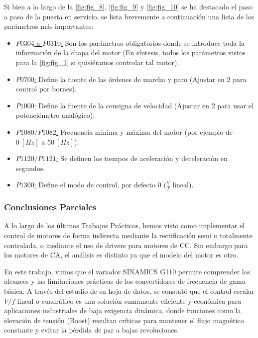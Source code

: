 \documentclass[12pt,a4paper]{article}
\begin{document}
\begin{itemize}
    Si bien a lo largo de la \autoref{fig:fig_8}, \autoref{fig:fig_9} y \autoref{fig:fig_10} se ha destacado el paso a paso de la puesta en servicio, se lista brevemente a continuación una lista de los parámetros más importantes:
    \begin{itemize}
        \item \underline{$P0304$ a $P0310$:} Son los parámetros obligatorios donde se introduce toda la información de la chapa del motor (En síntesis, todos los parámetros vistos para la \autoref{fig:fig_1} si quisiéramos controlar tal motor).
        \item \underline{$P0700$:} Define la fuente de las órdenes de marcha y paro (Ajustar en 2 para control por bornes).
        \item \underline{$P1000$:} Define la fuente de la consigna de velocidad (Ajustar en 2 para usar el potenciómetro analógico).
        \item \underline{$P1080 / P1082$:} Frecuencia mínima y máxima del motor (por ejemplo de $0 \ [Hz]$ a $50 \ [Hz]$).
        \item \underline{$P1120 / P1121$:} Se definen los tiempos de aceleración y deceleración en segundos.
        \item \underline{$P1300$:} Define el modo de control, por defecto 0 ($\frac{V}{f}$ lineal).
    \end{itemize}
\end{itemize}



\subsubsection{Conclusiones Parciales}
A lo largo de los últimos Trabajos Prácticos, hemos visto como implementar el control de motores de forma indirecta mediante la rectificación semi o totalmente controlada, o mediante el uso de drivers para motores de CC. Sin embargo para los motores de CA, el análisis es distinto ya que el modelo del motor es otro.

En este trabajo, vimos que el variador SINAMICS G110 permite comprender los alcances y las limitaciones prácticas de los convertidores de frecuencia de gama básica. A través del estudio de su hoja de datos, se constató que el control escalar $V/f$ lineal o cuadrático es una solución sumamente eficiente y económica para aplicaciones industriales de baja exigencia dinámica, donde funciones como la elevación de tensión (Boost) resultan críticas para mantener el flujo magnético constante y evitar la pérdida de par a bajas revoluciones.
\end{document}
